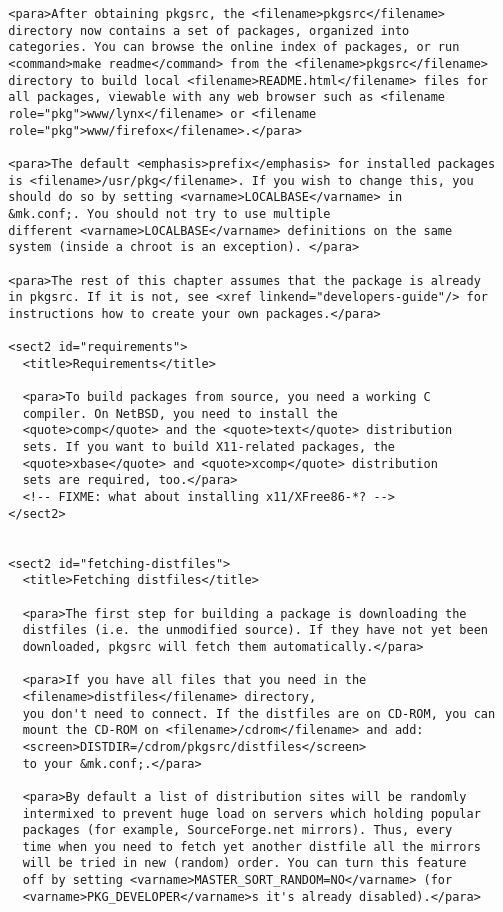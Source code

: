 \begin{verbatim}
  <para>After obtaining pkgsrc, the <filename>pkgsrc</filename>
  directory now contains a set of packages, organized into
  categories. You can browse the online index of packages, or run
  <command>make readme</command> from the <filename>pkgsrc</filename>
  directory to build local <filename>README.html</filename> files for
  all packages, viewable with any web browser such as <filename
  role="pkg">www/lynx</filename> or <filename
  role="pkg">www/firefox</filename>.</para>

  <para>The default <emphasis>prefix</emphasis> for installed packages
  is <filename>/usr/pkg</filename>. If you wish to change this, you
  should do so by setting <varname>LOCALBASE</varname> in
  &mk.conf;. You should not try to use multiple
  different <varname>LOCALBASE</varname> definitions on the same
  system (inside a chroot is an exception). </para>

  <para>The rest of this chapter assumes that the package is already
  in pkgsrc. If it is not, see <xref linkend="developers-guide"/> for
  instructions how to create your own packages.</para>

  <sect2 id="requirements">
    <title>Requirements</title>

    <para>To build packages from source, you need a working C
    compiler. On NetBSD, you need to install the
    <quote>comp</quote> and the <quote>text</quote> distribution
    sets. If you want to build X11-related packages, the
    <quote>xbase</quote> and <quote>xcomp</quote> distribution
    sets are required, too.</para>
    <!-- FIXME: what about installing x11/XFree86-*? -->
  </sect2>


  <sect2 id="fetching-distfiles">
    <title>Fetching distfiles</title>

    <para>The first step for building a package is downloading the
    distfiles (i.e. the unmodified source). If they have not yet been
    downloaded, pkgsrc will fetch them automatically.</para>

    <para>If you have all files that you need in the
    <filename>distfiles</filename> directory,
    you don't need to connect. If the distfiles are on CD-ROM, you can
    mount the CD-ROM on <filename>/cdrom</filename> and add:
    <screen>DISTDIR=/cdrom/pkgsrc/distfiles</screen>
    to your &mk.conf;.</para>

    <para>By default a list of distribution sites will be randomly
    intermixed to prevent huge load on servers which holding popular
    packages (for example, SourceForge.net mirrors). Thus, every
    time when you need to fetch yet another distfile all the mirrors
    will be tried in new (random) order. You can turn this feature
    off by setting <varname>MASTER_SORT_RANDOM=NO</varname> (for
    <varname>PKG_DEVELOPER</varname>s it's already disabled).</para>


\end{verbatim}
